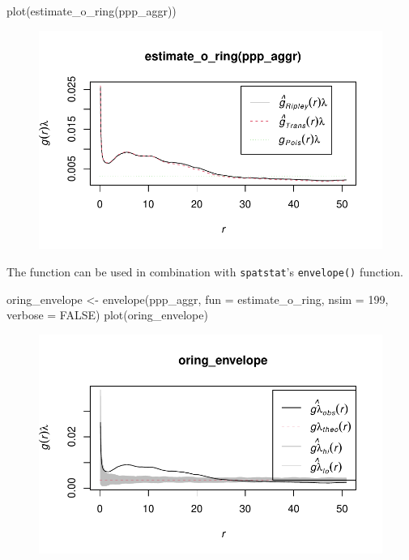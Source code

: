 \documentclass[
  letterpaper,
  DIV=11,
  numbers=noendperiod]{scrreprt}
\newenvironment{Shaded}{\begin{snugshade}}{\end{snugshade}}
\newcommand{\AttributeTok}[1]{\textcolor[rgb]{0.40,0.45,0.13}{#1}}
\newcommand{\ConstantTok}[1]{\textcolor[rgb]{0.56,0.35,0.01}{#1}}
\newcommand{\DecValTok}[1]{\textcolor[rgb]{0.68,0.00,0.00}{#1}}
\newcommand{\FunctionTok}[1]{\textcolor[rgb]{0.28,0.35,0.67}{#1}}
\newcommand{\NormalTok}[1]{\textcolor[rgb]{0.00,0.23,0.31}{#1}}
\newcommand{\OtherTok}[1]{\textcolor[rgb]{0.00,0.23,0.31}{#1}}
\begin{document}
\begin{Shaded}
\begin{Highlighting}[]
\FunctionTok{plot}\NormalTok{(}\FunctionTok{estimate\_o\_ring}\NormalTok{(ppp\_aggr))}
\end{Highlighting}
\end{Shaded}

\begin{figure}[H]

{\centering \includegraphics{spatial-tests_files/figure-pdf/unnamed-chunk-40-2.pdf}

}

\end{figure}

The function can be used in combination with \texttt{spatstat}'s
\texttt{envelope()} function.

\begin{Shaded}
\begin{Highlighting}[]
\NormalTok{oring\_envelope }\OtherTok{\textless{}{-}} \FunctionTok{envelope}\NormalTok{(ppp\_aggr, }\AttributeTok{fun =}\NormalTok{ estimate\_o\_ring, }\AttributeTok{nsim =} \DecValTok{199}\NormalTok{, }\AttributeTok{verbose =} \ConstantTok{FALSE}\NormalTok{)}
\FunctionTok{plot}\NormalTok{(oring\_envelope)}
\end{Highlighting}
\end{Shaded}

\begin{figure}[H]

{\centering \includegraphics{spatial-tests_files/figure-pdf/unnamed-chunk-41-1.pdf}

}

\end{figure}
\end{document}
